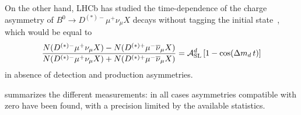 On the other hand, LHCb has studied the time-dependence of the 
charge asymmetry of $B^0 \to D^{(*)-}\mu^+\nu_{\mu}X$ decays
without tagging the initial state~\cite{Aaij:2014nxa}, 
which would be equal to 
\begin{equation} 
\frac{N(D^{(*)-}\mu^+\nu_{\mu}X)-N(D^{(*)+}\mu^-\bar{\nu}_{\mu}X)}%
{N(D^{(*)-}\mu^+\nu_{\mu}X)+N(D^{(*)+}\mu^-\bar{\nu}_{\mu}X)} =
\ASLd \left[ 1- \cos(\dmd \,t)\right]
\label{eq:untagged_ASL}
\end{equation}
in absence of detection and production asymmetries.

 summarizes the different measurements: 
in all cases asymmetries compatible with zero have been found,  
with a precision limited by the available statistics. 


